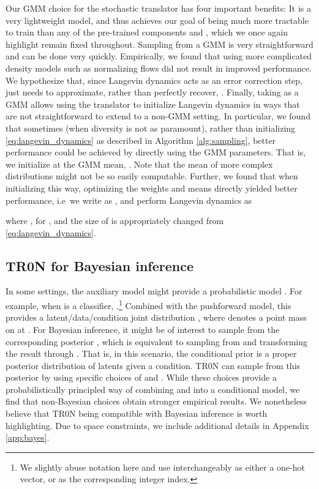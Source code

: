 \documentclass[nohyperref]{article}
\theoremstyle{plain}
\theoremstyle{definition}
\theoremstyle{remark}
\begin{document}
Our GMM choice for the stochastic translator has four important benefits:  It is a very lightweight model, and thus achieves our goal of being much more tractable to train than any of the pre-trained components  and , which we once again highlight remain fixed throughout.  Sampling from a GMM is very straightforward and can be done very quickly.  Empirically, we found that using more complicated density models  such as normalizing flows did not result in improved performance. We hypothesize that, since Langevin dynamics acts as an error correction step,  just needs to approximate, rather than perfectly recover, .  Finally, taking  as a GMM allows using the translator to initialize Langevin dynamics in ways that are not straightforward to extend to a non-GMM setting. In particular, we found that sometimes (when diversity is not as paramount), rather than initializing \eqref{eq:langevin_dynamics} as described in Algorithm \ref{alg:sampling}, better performance could be achieved by directly using the GMM parameters. That is, we initialize at the GMM mean, . Note that the mean of more complex distributions might not be so easily computable. Further, we found that when initializing this way, optimizing the weights and means directly yielded better performance, i.e\ we write  as , and perform Langevin dynamics as

where ,  for , and the size of  is appropriately changed from \eqref{eq:langevin_dynamics}.

\subsection{TR0N for Bayesian inference}\label{sec:bayes}

In some settings, the auxiliary model  might provide a probabilistic model . For example, when  is a classifier, .\footnote{We slightly abuse notation here and use  interchangeably as either a one-hot vector, or as the corresponding integer index.}  Combined with the pushforward model, this provides a latent/data/condition joint distribution , where  denotes a point mass on  at . For Bayesian inference, it might be of interest to sample from the corresponding posterior , which is equivalent to sampling from  and transforming the result through . That is, in this scenario, the conditional prior  is a proper posterior distribution of latents given a condition. TR0N can sample from this posterior by using specific choices of  and . While these choices provide a probabilistically principled way of combining  and  into a conditional model, we find that non-Bayesian choices obtain stronger empirical results. We nonetheless believe that TR0N being compatible with Bayesian inference is worth highlighting. Due to space constraints, we include additional details in Appendix \ref{app:bayes}.
\end{document}
